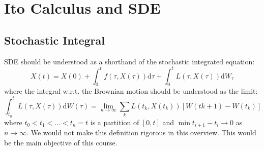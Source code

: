 \newcommand{\ito}{Ito }
\section{\ito Calculus and SDE}
\subsection{Stochastic Integral}

SDE should be understood as a shorthand of the stochastic integrated equation:
$$
X(t)=X(0)+\int_{0}^{t} f(\tau,X(\tau))\mathrm{d}\tau + \int_{0}^{t}L(\tau,X(\tau))\mathrm{d}W_\tau
$$
where the integral w.r.t. the Brownian motion should be understood as the limit:
$$
\int_{t_0}^{t}L(\tau,X(\tau))\mathrm{d}W(\tau) = \lim_{n \to \infty}  \sum_{k}L(t_k,X(t_k))\left[ W(t{k+1})-W(t_k) \right] 
$$
where $t_0<t_1<\dots<t_n = t$ is a partition of $[0,t]$ and $\min t_{i+1} - t_i \to 0$ as $n\to \infty$.
We would not make this definition rigorous in this overview. This would be the main objective of this course.


